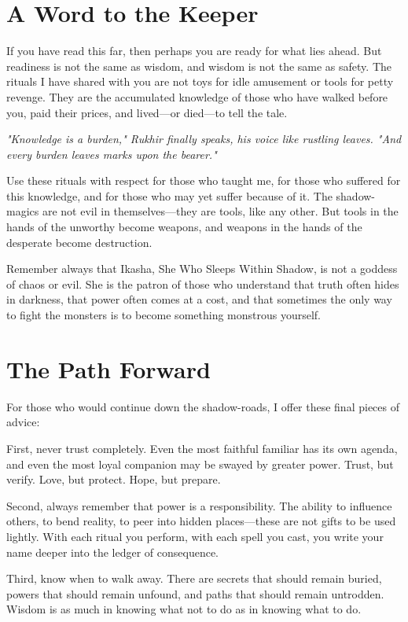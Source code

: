 \documentclass[12pt,twoside]{book}
\newcommand{\shadow}[1]{\textit{#1}}
\begin{document}
\section*{A Word to the Keeper}

If you have read this far, then perhaps you are ready for what lies ahead. But readiness is not the same as wisdom, and wisdom is not the same as safety. The rituals I have shared with you are not toys for idle amusement or tools for petty revenge. They are the accumulated knowledge of those who have walked before you, paid their prices, and lived—or died—to tell the tale.

\shadow{"Knowledge is a burden," Rukhir finally speaks, his voice like rustling leaves. "And every burden leaves marks upon the bearer."}

Use these rituals with respect for those who taught me, for those who suffered for this knowledge, and for those who may yet suffer because of it. The shadow-magics are not evil in themselves—they are tools, like any other. But tools in the hands of the unworthy become weapons, and weapons in the hands of the desperate become destruction.

Remember always that Ikasha, She Who Sleeps Within Shadow, is not a goddess of chaos or evil. She is the patron of those who understand that truth often hides in darkness, that power often comes at a cost, and that sometimes the only way to fight the monsters is to become something monstrous yourself.

\section*{The Path Forward}

For those who would continue down the shadow-roads, I offer these final pieces of advice:

First, never trust completely. Even the most faithful familiar has its own agenda, and even the most loyal companion may be swayed by greater power. Trust, but verify. Love, but protect. Hope, but prepare.

Second, always remember that power is a responsibility. The ability to influence others, to bend reality, to peer into hidden places—these are not gifts to be used lightly. With each ritual you perform, with each spell you cast, you write your name deeper into the ledger of consequence.

Third, know when to walk away. There are secrets that should remain buried, powers that should remain unfound, and paths that should remain untrodden. Wisdom is as much in knowing what not to do as in knowing what to do.
\end{document}
